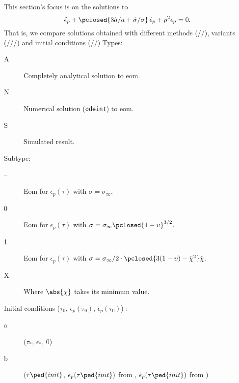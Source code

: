     This section's focus is on the solutions to
    \begin{equation}
        \ddot{\epsilon}_p + \pclosed{ 3\dot{a}/a + \dot{\sigma}/\sigma } \,\dot{\epsilon}_p + p^2 \epsilon_p= 0.
    \end{equation}
    That is, we compare solutions obtained with different methods (//), variants (\lbl{--}///) and initial conditions (//)
    Types:
    \begin{description}
        \item[A] Completely analytical solution to eom.
        \item[N] Numerical solution (\texttt{odeint}) to eom. 
        \item[S] Simulated result.
    \end{description}
    Subtype:
    \begin{description}
        \item[--] Eom for $\epsilon_p(\tau)$ with $\sigma= \sigma_\infty$.
        \item[0] Eom for $\epsilon_p(\tau)$ with $\sigma= \sigma_\infty \pclosed{ 1 - \upsilon }^{3/2}$.
        \item[1] Eom for $\epsilon_p(\tau)$ with $\sigma= \sigma_\infty/ 2 \cdot \pclosed{ 3(1-\upsilon)- \breve{\chi}^2} \breve{\chi}$.
        \item[X] Where $\abs{\chi}$ takes its minimum value.
    \end{description}
    Initial conditions ($\tau_0$, $\epsilon_p(\tau_0)$, $\dot{\epsilon}_p(\tau_0)$) :
    \begin{description}
        \item[a] ($\tau_\ast$, $\epsilon_\ast$, $0$) 
        \item[b] ($\tau\ped{init}$, $\epsilon_p(\tau\ped{init})$ from , $\dot{\epsilon}_p(\tau\ped{init})$ from )
    \end{description}









